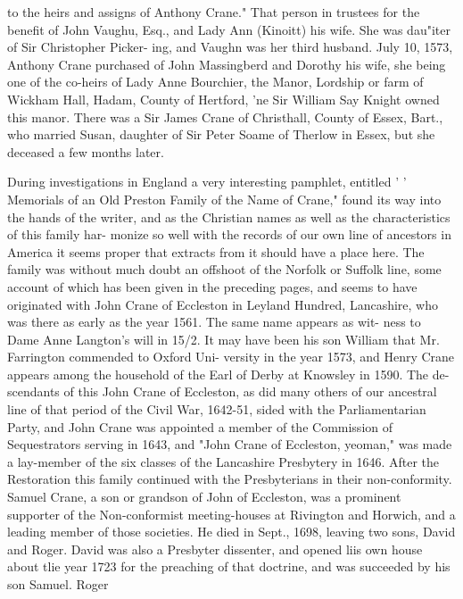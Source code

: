 \documentclass[oneside]{book}
\begin{document}
to the heirs and assigns of Anthony Crane." That person in 
trustees for the benefit of John Vaughu, Esq., and Lady Ann 
(Kinoitt) his wife. She was dau"iter of Sir Christopher Picker- 
ing, and Vaughn was her third husband. July 10, 1573, Anthony 
Crane purchased of John Massingberd and Dorothy his wife, she 
being one of the co-heirs of Lady Anne Bourchier, the Manor, 
Lordship or farm of Wickham Hall, Hadam, County of Hertford, 
'ne Sir William Say Knight owned this manor. There was a Sir 
James Crane of Christhall, County of Essex, Bart., who married 
Susan, daughter of Sir Peter Soame of Therlow in Essex, but she 
deceased a few months later. 

During investigations in England a very interesting pamphlet, 
entitled ' ' Memorials of an Old Preston Family of the Name of 
Crane," found its way into the hands of the writer, and as the 
Christian names as well as the characteristics of this family har- 
monize so well with the records of our own line of ancestors in 
America it seems proper that extracts from it should have a 
place here. The family was without much doubt an offshoot of 
the Norfolk or Suffolk line, some account of which has been given 
in the preceding pages, and seems to have originated with John 
Crane of Eccleston in Leyland Hundred, Lancashire, who was 
there as early as the year 1561. The same name appears as wit- 
ness to Dame Anne Langton's will in 15/2. It may have been 
his son William that Mr. Farrington commended to Oxford Uni- 
versity in the year 1573, and Henry Crane appears among the 
household of the Earl of Derby at Knowsley in 1590. The de- 
scendants of this John Crane of Eccleston, as did many others of 
our ancestral line of that period of the Civil War, 1642-51, sided 
with the Parliamentarian Party, and John Crane was appointed a 
member of the Commission of Sequestrators serving in 1643, and 
"John Crane of Eccleston, yeoman," was made a lay-member of 
the six classes of the Lancashire Presbytery in 1646. After the 
Restoration this family continued with the Presbyterians in their 
non-conformity. Samuel Crane, a son or grandson of John of 
Eccleston, was a prominent supporter of the Non-conformist 
meeting-houses at Rivington and Horwich, and a leading member 
of those societies. He died in Sept., 1698, leaving two sons, 
David and Roger. David was also a Presbyter dissenter, and 
opened liis own house about tlie year 1723 for the preaching of 
that doctrine, and was succeeded by his son Samuel. Roger 
\end{document}
